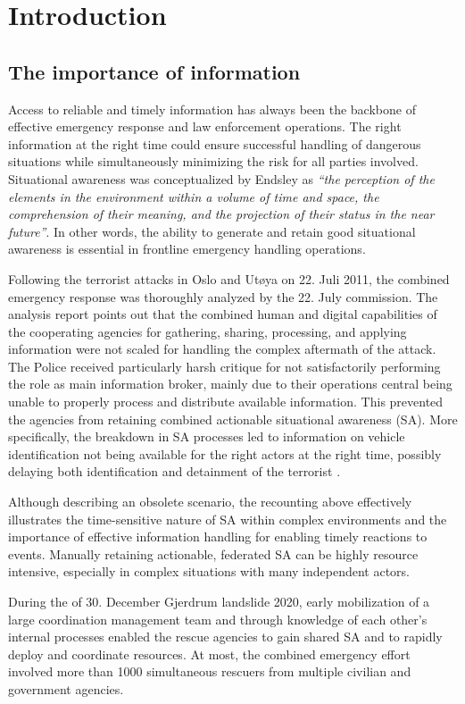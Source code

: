 \chapter{Introduction}
\section{The importance of information}
Access to reliable and timely information has always been the backbone of effective emergency response and law enforcement operations. The right information at the right time could ensure successful handling of dangerous situations while simultaneously minimizing the risk for all parties involved. Situational awareness was conceptualized by Endsley \cite{endsley_endsley_1995} as \textit{“the perception of the elements in the environment within a volume of time and space, the comprehension of their meaning, and the projection of their status in the near future”}. In other words, the ability to generate and retain good situational awareness is essential in frontline emergency handling operations.

Following the terrorist attacks in Oslo and Utøya on 22. Juli 2011, the combined emergency response was thoroughly analyzed by the 22. July commission. The analysis report \cite{nou_2012_14_rapport_2012} points out that the combined human and digital capabilities of the cooperating agencies for gathering, sharing, processing, and applying information were not scaled for handling the complex aftermath of the attack. The Police received particularly harsh critique for not satisfactorily performing the role as main information broker, mainly due to their operations central being unable to properly process and distribute available information. This prevented the agencies from retaining combined actionable situational awareness (SA). More specifically, the breakdown in SA processes led to information on vehicle identification not being available for the right actors at the right time, possibly delaying both identification and detainment of the terrorist \cite{nou_2012_14_rapport_2012}.
 
Although describing an obsolete scenario, the recounting above effectively illustrates the time-sensitive nature of SA within complex environments and the importance of effective information handling for enabling timely reactions to events. Manually retaining actionable, federated SA can be highly resource intensive, especially in complex situations with many independent actors.

During the of 30. December Gjerdrum landslide 2020, early mobilization of a large coordination management team and through knowledge of each other’s internal processes enabled the rescue agencies to gain shared SA and to rapidly deploy and coordinate resources. At most, the combined emergency effort involved more than 1000 simultaneous rescuers from multiple civilian and government agencies. 

